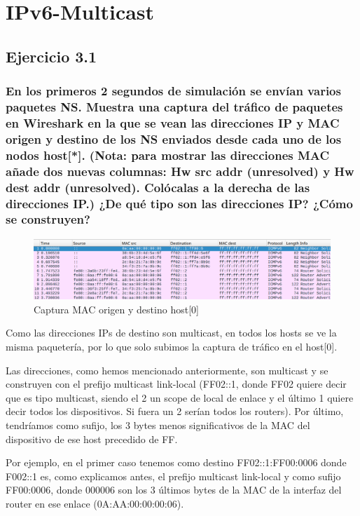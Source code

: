 \chapter{IPv6-Multicast}
\label{chap:ipv6_multicast}

\section{Ejercicio 3.1}
\subsection{En los primeros 2 segundos de simulación se envían varios paquetes NS. Muestra una captura del tráfico de
paquetes en Wireshark en la que se vean las direcciones IP y MAC origen y destino de los NS enviados desde
cada uno de los nodos host[*]. (Nota: para mostrar las direcciones MAC añade dos nuevas columnas: Hw src
addr (unresolved) y Hw dest addr (unresolved). Colócalas a la derecha de las direcciones IP.) ¿De qué tipo son
las direcciones IP? ¿Cómo se construyen?}

\begin{figure}[H]
    \centering
    \includegraphics[width=135mm, scale=0.75]{imaxes/captura_ejer3_1.png}
    \caption{Captura MAC origen y destino host[0]}
    \label{fig:ip_mac_host0}
\end{figure}

Como las direcciones IPs de destino son multicast, en todos los hosts se ve la misma paquetería, por lo que solo subimos la captura de tráfico en el host[0].

Las direcciones, como hemos mencionado anteriormente, son multicast y se construyen con el prefijo multicast link-local (FF02::1, donde FF02 quiere decir que es tipo multicast, siendo el 2 un scope de local de enlace y el último 1 quiere decir todos los dispositivos. Si fuera un 2 serían todos los routers). Por último, tendríamos como sufijo, los 3 bytes menos significativos de la MAC del dispositivo de ese host precedido de FF.

Por ejemplo, en el primer caso tenemos como destino FF02::1:FF00:0006 donde F002::1 es, como explicamos antes, el prefijo multicast link-local y como sufijo FF00:0006, donde 000006 son los 3 últimos bytes de la MAC de la interfaz del router en ese enlace (0A:AA:00:00:00:06).

